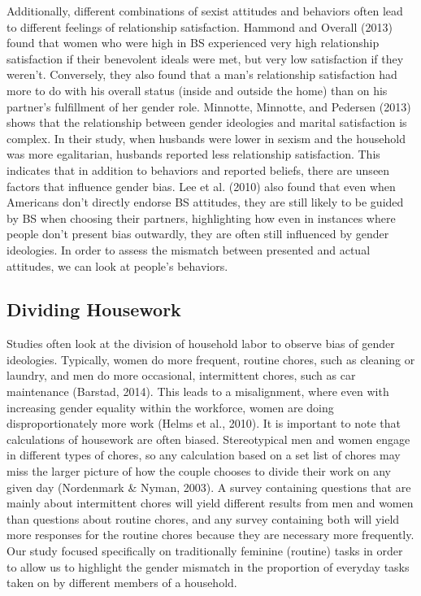 \documentclass[
  man]{apa6}
\begin{document}
Additionally, different combinations of sexist attitudes and behaviors often lead to different feelings of relationship satisfaction. Hammond and Overall (2013) found that women who were high in BS experienced very high relationship satisfaction if their benevolent ideals were met, but very low satisfaction if they weren't. Conversely, they also found that a man's relationship satisfaction had more to do with his overall status (inside and outside the home) than on his partner's fulfillment of her gender role. Minnotte, Minnotte, and Pedersen (2013) shows that the relationship between gender ideologies and marital satisfaction is complex. In their study, when husbands were lower in sexism and the household was more egalitarian, husbands reported less relationship satisfaction. This indicates that in addition to behaviors and reported beliefs, there are unseen factors that influence gender bias. Lee et al. (2010) also found that even when Americans don't directly endorse BS attitudes, they are still likely to be guided by BS when choosing their partners, highlighting how even in instances where people don't present bias outwardly, they are often still influenced by gender ideologies. In order to assess the mismatch between presented and actual attitudes, we can look at people's behaviors.

\hypertarget{dividing-housework}{%
\subsection{Dividing Housework}\label{dividing-housework}}

Studies often look at the division of household labor to observe bias of gender ideologies. Typically, women do more frequent, routine chores, such as cleaning or laundry, and men do more occasional, intermittent chores, such as car maintenance (Barstad, 2014). This leads to a misalignment, where even with increasing gender equality within the workforce, women are doing disproportionately more work (Helms et al., 2010). It is important to note that calculations of housework are often biased. Stereotypical men and women engage in different types of chores, so any calculation based on a set list of chores may miss the larger picture of how the couple chooses to divide their work on any given day (Nordenmark \& Nyman, 2003). A survey containing questions that are mainly about intermittent chores will yield different results from men and women than questions about routine chores, and any survey containing both will yield more responses for the routine chores because they are necessary more frequently. Our study focused specifically on traditionally feminine (routine) tasks in order to allow us to highlight the gender mismatch in the proportion of everyday tasks taken on by different members of a household.
\end{document}
